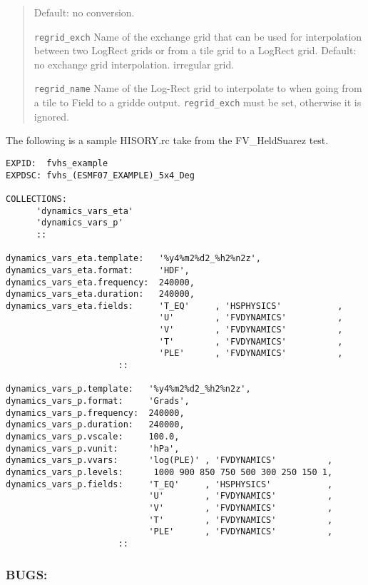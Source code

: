\begin{quote}
\begin{trivlist}
                         Default: no conversion.
\item[\tt regrid\_exch]  Name of the exchange grid that can be used for interpolation
                         between two LogRect grids or from a tile grid to a LogRect grid.
                         Default: no exchange grid interpolation.
                         irregular grid.
\item[\tt regrid\_name]  Name of the Log-Rect grid to interpolate to when going from a tile 
                         to Field to a gridde output. {\tt regrid\_exch} must be set, otherwise
                         it is ignored.
\end{trivlist}
\end{quote}

The following is a sample HISORY.rc take from the FV\_HeldSuarez test.
\begin{verbatim}
EXPID:  fvhs_example
EXPDSC: fvhs_(ESMF07_EXAMPLE)_5x4_Deg

COLLECTIONS:
      'dynamics_vars_eta'
      'dynamics_vars_p'
      ::

dynamics_vars_eta.template:   '%y4%m2%d2_%h2%n2z',
dynamics_vars_eta.format:     'HDF',
dynamics_vars_eta.frequency:  240000,
dynamics_vars_eta.duration:   240000,
dynamics_vars_eta.fields:     'T_EQ'     , 'HSPHYSICS'           ,
                              'U'        , 'FVDYNAMICS'          ,
                              'V'        , 'FVDYNAMICS'          ,
                              'T'        , 'FVDYNAMICS'          ,
                              'PLE'      , 'FVDYNAMICS'          ,
                      ::

dynamics_vars_p.template:   '%y4%m2%d2_%h2%n2z',
dynamics_vars_p.format:     'Grads',
dynamics_vars_p.frequency:  240000,
dynamics_vars_p.duration:   240000,
dynamics_vars_p.vscale:     100.0,
dynamics_vars_p.vunit:      'hPa',
dynamics_vars_p.vvars:      'log(PLE)' , 'FVDYNAMICS'          ,   
dynamics_vars_p.levels:      1000 900 850 750 500 300 250 150 1,
dynamics_vars_p.fields:     'T_EQ'     , 'HSPHYSICS'           ,
                            'U'        , 'FVDYNAMICS'          ,
                            'V'        , 'FVDYNAMICS'          ,
                            'T'        , 'FVDYNAMICS'          ,
                            'PLE'      , 'FVDYNAMICS'          ,
                      ::
\end{verbatim}

\subsubsection*{BUGS:}

